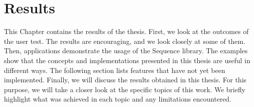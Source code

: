 \chapter{Results}
This Chapter contains the results of the thesis. 
First, we look at the outcomes of the user test. The results are encouraging,
and we look closely at some of them. Then, applications demonstrate the usage
of the Sequence library. The examples show that the concepts and
implementations presented in this thesis are useful in different ways. The
following section lists features that have not
yet been implemented. 
Finally, we will discuss the results obtained in this thesis. For this purpose,
we will take a closer look at the specific topics of this work. We briefly highlight what was
achieved in each topic and any limitations encountered.




